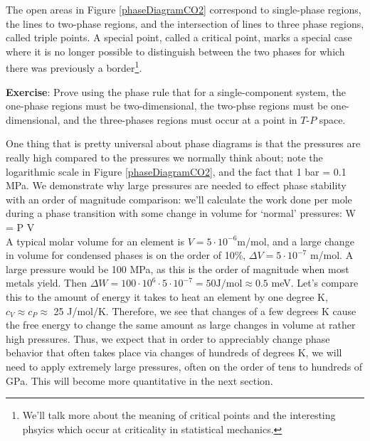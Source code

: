 \documentclass[12pt]{article}
\begin{document}
The open areas in Figure \ref{phaseDiagramCO2} correspond to single-phase regions, the lines to two-phase regions, and the intersection of lines to three phase regions, called triple points. A special point, called a critical point, marks a special case where it is no longer possible to distinguish between the two phases for which there was previously a border\footnote{We'll talk more about the meaning of critical points and the interesting phsyics which occur at criticality in statistical mechanics.}.

\textbf{Exercise}: Prove using the phase rule that for a single-component system, the one-phase regions must be two-dimensional, the two-phse regions must be one-dimensional, and the three-phases regions must occur at a point in $T$-$P$ space.

One thing that is pretty universal about phase diagrams is that the pressures are really high compared to the pressures we normally think about; note the logarithmic scale in Figure \ref{phaseDiagramCO2}, and the fact that 1 bar = 0.1 MPa. We demonstrate why large pressures are needed to effect phase stability with an order of magnitude comparison: we'll calculate the work done per mole during a phase transition with some change in volume for `normal' pressures:
\eqs
\Delta W = P \cdot \Delta V\\
\eqe
A typical molar volume for an element is $V = 5 \cdot 10^{-6}$m\three/mol, and a large change in volume for condensed phases is on the order of 10\%, $\Delta V = 5 \cdot 10^{-7}$ m\three/mol. A large pressure would be 100 MPa, as this is the order of magnitude when most metals yield. Then $\Delta W = 100\cdot 10^{6} \cdot 5 \cdot 10^{-7} = 50 \text{J/mol} \approx 0.5$ meV. Let's compare this to the amount of energy it takes to heat an element by one degree K, $c_V\approx c_P \approx$ 25 J/mol/K. Therefore, we see that changes of a few degrees K cause the free energy to change the same amount as large changes in volume at rather high pressures. Thus, we expect that in order to appreciably change phase behavior that often takes place via changes of hundreds of degrees K, we will need to apply extremely large pressures, often on the order of tens to hundreds of GPa. This will become more quantitative in the next section.

\end{document}
